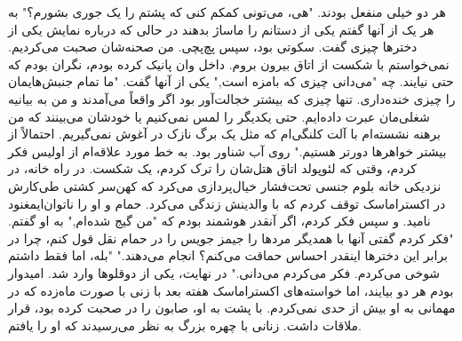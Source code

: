 هر دو خیلی منفعل بودند.
"هی، می‌تونی کمکم کنی که پشتم را یک جوری بشورم؟"
به هر یک از آنها گفتم یکی از دستانم را ماساژ بدهند در حالی که درباره نمایش
یکی از دخترها چیزی گفت. سکوتی بود، سپس پچ‌پچی. من
صحنه‌شان صحبت می‌کردیم. نمی‌خواستم با شکست از اتاق بیرون بروم.
داخل وان پانیک کرده بودم، نگران بودم که حتی نیایند. چه
"می‌دانی چیزی که بامزه است," یکی از آنها گفت. "ما تمام جنبش‌هایمان را
چیزی خنده‌داری. تنها چیزی که بیشتر خجالت‌آور بود اگر واقعاً می‌آمدند و من به بیانیه شغلی‌مان عبرت داده‌ایم. حتی یکدیگر را لمس نمی‌کنیم یا
خودشان می‌بینند که من برهنه نشسته‌ام با آلت کلنگی‌ام که مثل یک برگ نازک
در آغوش نمی‌گیریم. احتمالاً از بیشتر خواهرها دورتر هستیم."
روی آب شناور بود. به خط مورد علاقه‌ام از اولیس فکر کردم، وقتی که لئوپولد
اتاق هتل‌شان را ترک کردم، یک شکست. در راه خانه، در نزدیکی خانه
بلوم جنسی تحت‌فشار خیال‌پردازی می‌کرد که کهن‌سر کشتی طی‌کارش در
اکستراماسک توقف کردم که با والدینش زندگی می‌کرد.
حمام و او را ناتوان‌ایمغنود نامید. و سپس فکر کردم، اگر آنقدر هوشمند بودم که
"من گیج شده‌ام," به او گفتم. "فکر کردم گفتی آنها با همدیگر مردها را
جیمز جویس را در حمام نقل قول کنم، چرا در برابر این دخترها اینقدر احساس حماقت می‌کنم؟
انجام می‌دهند."
"بله، اما فقط داشتم شوخی می‌کردم. فکر می‌کردم می‌دانی."
در نهایت، یکی از دوقلوها وارد شد. امیدوار بودم هر دو بیایند، اما خواسته‌های
اکستراماسک هفته بعد با زنی با صورت ماه‌زده که در مهمانی به او
بیش از حدی نمی‌کردم. با پشت به او، صابون را در
صحبت کرده بود، قرار ملاقات داشت. زنانی با چهره بزرگ به نظر می‌رسیدند که او را
یافتم.